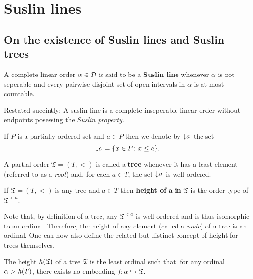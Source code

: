 \chapter{Suslin lines}

\section{On the existence of Suslin lines and Suslin trees}

\begin{dfn}
	A complete linear order $\alpha\in\mathcal{D}$ is said to be a \textbf{Suslin line} whenever $\alpha$ is not seperable and every pairwise disjoint set of open intervals in $\alpha$ is at most countable.
\end{dfn}

Restated succintly:  A suslin line is a complete inseperable linear order without endpoints posessing the \textit{Suslin property}.

\begin{dfn}
	If $P$ is a partially ordered set and $a\in P$ then we denote by $\left\downarrow a\right.$ the set
	\begin{equation}
		\left\downarrow a\right.=\lbrace x\in P\colon x\leq a \rbrace.
	\end{equation}
\end{dfn}

\begin{dfn}[Tree]
	A partial order $\mathfrak{T}=(T,<)$ is called a \textbf{tree} whenever it has a least element (referred to as a \textit{root}) and, for each $a\in T$, the set $\left\downarrow a\right.$ is well-ordered.
\end{dfn}

\begin{dfn}[Height]
	If $\mathfrak{T}=(T,<)$ is any tree and $a\in T$ then \textbf{height of }$\mathbf{a}$\textbf{ in }$\bm{\mathfrak{T}}$ is the order type of $\mathfrak{T}^{<a}$.
\end{dfn}

Note that, by definition of a tree, any $\mathfrak{T}^{<a}$ is well-ordered and is thus isomorphic to an ordinal.  Therefore, the height of any element (called a \textit{node}) of a tree is an ordinal.  One can now also define the related but distinct concept of height for trees themselves.

\begin{dfn}
	The height $\mathit{h}(\mathfrak{T})$ of a tree $\mathfrak{T}$ is the least ordinal such that, for any ordinal $\alpha>\mathit{h}(T)$, there exists no embedding $f\colon\alpha\hookrightarrow\mathfrak{T}$.
\end{dfn}


